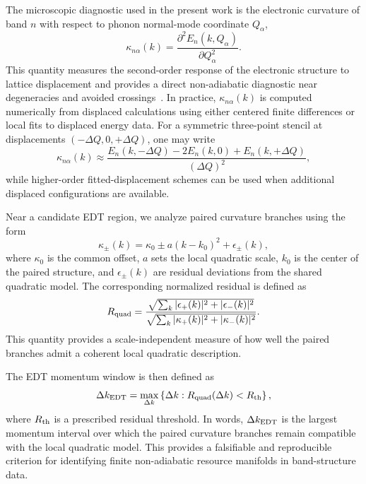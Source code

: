 ﻿\documentclass[aps,prx,reprint,superscriptaddress,longbibliography,floatfix]{revtex4-2}
\begin{document}
The microscopic diagnostic used in the present work is the electronic curvature of band $n$ with respect to phonon normal-mode coordinate $Q_\alpha$,
\begin{equation}
\kappa_{n\alpha}(k)=\frac{\partial^2 E_n(k,Q_\alpha)}{\partial Q_\alpha^2}.
\end{equation}
This quantity measures the second-order response of the electronic structure to lattice displacement and provides a direct non-adiabatic diagnostic near degeneracies and avoided crossings~\cite{Mead1979,Yarkony1996,Giustino2017}. In practice, $\kappa_{n\alpha}(k)$ is computed numerically from displaced calculations using either centered finite differences or local fits to displaced energy data. For a symmetric three-point stencil at displacements $(-\Delta Q,0,+\Delta Q)$, one may write
\begin{equation}
\kappa_{n\alpha}(k)\approx
\frac{E_n(k,-\Delta Q)-2E_n(k,0)+E_n(k,+\Delta Q)}{(\Delta Q)^2},
\end{equation}
while higher-order fitted-displacement schemes can be used when additional displaced configurations are available.

Near a candidate EDT region, we analyze paired curvature branches using the form
\begin{equation}
\kappa_\pm(k)
=
\kappa_0
\pm a(k-k_0)^2
+
\epsilon_\pm(k),
\end{equation}
where $\kappa_0$ is the common offset, $a$ sets the local quadratic scale, $k_0$ is the center of the paired structure, and $\epsilon_\pm(k)$ are residual deviations from the shared quadratic model. The corresponding normalized residual is defined as
\begin{equation}
R_{\rm quad}
=
\frac{
\sqrt{\sum_k |\epsilon_+(k)|^2 + |\epsilon_-(k)|^2}
}{
\sqrt{\sum_k |\kappa_+(k)|^2 + |\kappa_-(k)|^2}
}.
\end{equation}
This quantity provides a scale-independent measure of how well the paired branches admit a coherent local quadratic description.

The EDT momentum window is then defined as
\begin{equation}
\Delta k_{\rm EDT}
=
\max_{\Delta k}
\left\{
\Delta k:
R_{\rm quad}(\Delta k)<R_{\rm th}
\right\},
\end{equation}
where $R_{\rm th}$ is a prescribed residual threshold. In words, $\Delta k_{\rm EDT}$ is the largest momentum interval over which the paired curvature branches remain compatible with the local quadratic model. This provides a falsifiable and reproducible criterion for identifying finite non-adiabatic resource manifolds in band-structure data.
\end{document}
